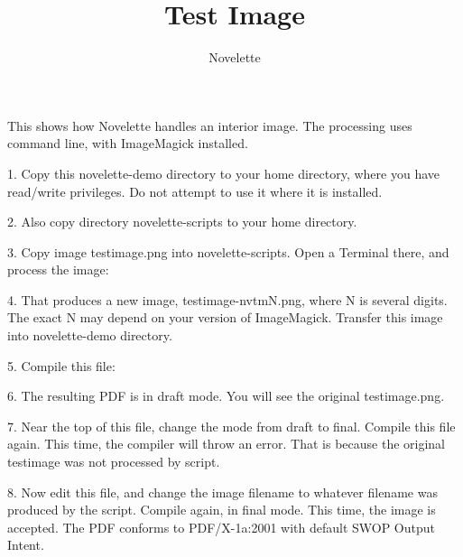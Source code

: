 \documentclass{novelette} %
\title{Test Image}
\author{Novelette}
\begin{document}
This shows how Novelette handles an interior image. The processing
uses  command line, with ImageMagick installed.

1. Copy this novelette-demo directory to your home directory, where you have
read/write privileges. Do not attempt to use it where it is installed.

2. Also copy directory novelette-scripts to your home directory.

3. Copy image testimage.png into novelette-scripts. Open a Terminal there,
and process the image:


4. That produces a new image, testimage-nvtmN.png, where N is several digits.
The exact N may depend on your version of ImageMagick. Transfer this image
into novelette-demo directory.

5. Compile this file: 

6. The resulting PDF is in draft mode. You will see the original testimage.png.


7. Near the top of this file, change the mode from draft to final.
Compile this file again. This time, the compiler will throw an error.
That is because the original testimage was not processed by script.

8. Now edit this file, and change the image filename
to whatever filename was produced by the script. Compile again, in final
mode. This time, the image is accepted. The PDF conforms to PDF/X-1a:2001
with default SWOP Output Intent.

\makeatletter\nocle@rtoendtrue\makeatother
\end{document}
